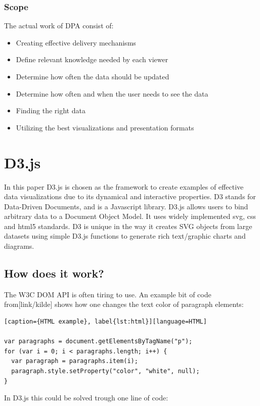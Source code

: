 \subsubsection{Scope}
The actual work of DPA consist of:
\begin{itemize}
\item Creating effective delivery mechanisms
\item Define relevant knowledge needed by each viewer
\item Determine how often the data should be updated
\item Determine how often and when the user needs to see the data
\item Finding the right data
\item Utilizing the best visualizations and presentation formats
\end{itemize}


\section{D3.js}
In this paper D3.js \citep{D3} is chosen as the framework to create examples of effective data visualizations due to its dynamical and interactive properties. 
D3 stands for Data-Driven Documents, and is a Javascript library. 
D3.js allows users to bind arbitrary data to a Document Object Model. It uses widely implemented \gls{svg}, \gls{css} and \gls{html}5 standards. D3 is unique in the way it creates SVG objects from large datasets using simple D3.js functions to generate rich text/graphic charts and diagrams. 


\subsection{How does it work?}
The W3C DOM API is often tiring to use. An example bit of code from[link/kilde] shows how one changes the text color of paragraph elements:

\begin{lstlisting}[caption={HTML example}, label{lst:html}][language=HTML]

var paragraphs = document.getElementsByTagName("p");
for (var i = 0; i < paragraphs.length; i++) {
  var paragraph = paragraphs.item(i);
  paragraph.style.setProperty("color", "white", null);
}

\end{lstlisting}

In D3.js this could be solved trough one line of code:

